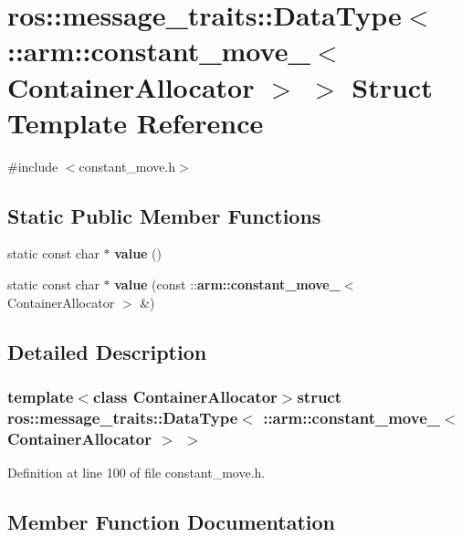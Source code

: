 \section{ros\-:\-:message\-\_\-traits\-:\-:\-Data\-Type$<$ \-:\-:arm\-:\-:constant\-\_\-move\-\_\-$<$ \-Container\-Allocator $>$ $>$ \-Struct \-Template \-Reference}
\label{structros_1_1message__traits_1_1DataType_3_01_1_1arm_1_1constant__move___3_01ContainerAllocator_01_4_01_4}


{\ttfamily \#include $<$constant\-\_\-move.\-h$>$}

\subsection*{\-Static \-Public \-Member \-Functions}
\begin{DoxyCompactItemize}
\item 
static const char $\ast$ {\bf value} ()
\item 
static const char $\ast$ {\bf value} (const \-::{\bf arm\-::constant\-\_\-move\-\_\-}$<$ \-Container\-Allocator $>$ \&)
\end{DoxyCompactItemize}


\subsection{\-Detailed \-Description}
\subsubsection*{template$<$class Container\-Allocator$>$struct ros\-::message\-\_\-traits\-::\-Data\-Type$<$ \-::arm\-::constant\-\_\-move\-\_\-$<$ Container\-Allocator $>$ $>$}



\-Definition at line 100 of file constant\-\_\-move.\-h.



\subsection{\-Member \-Function \-Documentation}
